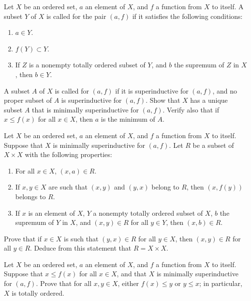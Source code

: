 \documentclass{article}
\begin{document}
\begin{exercise}
  \label{exe:8yw1mw3a}
  Let \(X\) be an ordered set, \(a\) an element of \(X\), and \(f\) a
  function from \(X\) to itself.  A subset \(Y\) of \(X\) is called
   for the pair \((a, f)\) if it satisfies
  the following conditions:
  \begin{enumerate}
  \item \(a \in Y\).
  \item \(f(Y) \subset Y\).
  \item If \(Z\) is a nonempty totally ordered subset of \(Y\), and
    \(b\) the supremum of \(Z\) in \(X\), then \(b \in Y\).
  \end{enumerate}
  A subset \(A\) of \(X\) is called  for \((a, f)\) if it is superinductive for
  \((a, f)\), and no proper subset of \(A\) is superinductive for
  \((a, f)\).  Show that \(X\) has a unique subset \(A\) that is
  minimally superinductive for \((a, f)\).  Verify also that if
  \(x \leq f(x)\) for all \(x \in X\), then \(a\) is the minimum of
  \(A\).
\end{exercise}

\begin{exercise}
  \label{exe:9l6q0c66}
  Let \(X\) be an ordered set, \(a\) an element of \(X\), and \(f\) a
  function from \(X\) to itself.  Suppose that \(X\) is minimally
  superinductive for \((a, f)\).  Let \(R\) be a subset of
  \(X \times X\) with the following properties:
  \begin{enumerate}
  \item \label{item:u0r5igra} For all \(x \in X\), \((x, a) \in R\).
  \item \label{item:3jc58w0r} If \(x, y \in X\) are such that
    \((x, y)\) and \((y, x)\) belong to \(R\), then \((x, f(y))\)
    belongs to \(R\).
  \item \label{item:fh1pwe19} If \(x\) is an element of \(X\), \(Y\) a
    nonempty totally ordered subset of \(X\), \(b\) the supremum of
    \(Y\) in \(X\), and \((x, y) \in R\) for all \(y \in Y\), then
    \((x, b) \in R\).
  \end{enumerate}
  Prove that if \(x \in X\) is such that \((y, x) \in R\) for all
  \(y \in X\), then \((x, y) \in R\) for all \(y \in R\).  Deduce from
  this statement that \(R = X \times X\).
\end{exercise}

\begin{exercise}
  \label{exe:yf8euudc}
  Let \(X\) be an ordered set, \(a\) an element of \(X\), and \(f\) a
  function from \(X\) to itself.  Suppose that \(x \leq f(x)\) for all
  \(x \in X\), and that \(X\) is minimally superinductive for
  \((a, f)\).  Prove that for all \(x,y \in X\), either
  \(f(x) \leq y\) or \(y \leq x\); in particular, \(X\) is totally
  ordered.
\end{exercise}
\end{document}
